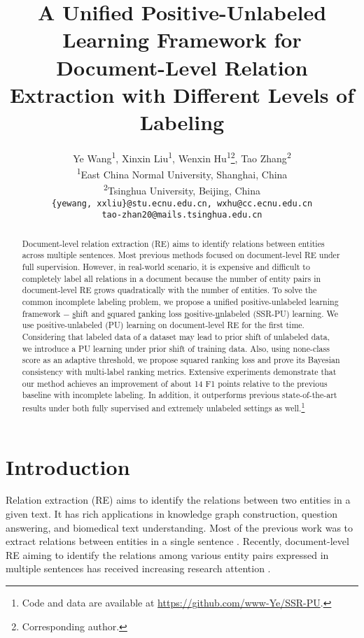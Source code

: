 \documentclass[11pt]{article}
\title{A Unified Positive-Unlabeled Learning Framework for Document-Level Relation Extraction with Different Levels of Labeling}
\author{Ye Wang\textsuperscript{1}, Xinxin Liu\textsuperscript{1}, Wenxin Hu\textsuperscript{1}\thanks{\enspace Corresponding author.}, Tao Zhang\textsuperscript{2} \\
  \textsuperscript{1}East China Normal University, Shanghai, China\\
  \textsuperscript{2}Tsinghua University, Beijing, China\\
  \texttt{\{yewang, xxliu\}@stu.ecnu.edu.cn, wxhu@cc.ecnu.edu.cn}\\
  \texttt{tao-zhan20@mails.tsinghua.edu.cn}}
\begin{document}
\maketitle
\begin{abstract}
Document-level relation extraction (RE) aims to identify relations between entities across multiple sentences. Most previous methods focused on document-level RE under full supervision. However, in real-world scenario, it is expensive and difficult to completely label all relations in a document because the number of entity pairs in document-level RE grows quadratically with the number of entities. \enspace To solve the common incomplete labeling problem, we propose a unified positive-unlabeled learning framework $-$ \underline{s}hift and \underline{s}quared \underline{r}anking loss \underline{p}ositive-\underline{u}nlabeled (SSR-PU) learning.
We use positive-unlabeled (PU) learning on document-level RE for the first time. Considering that labeled data of a dataset may lead to prior shift of unlabeled data, we introduce a PU learning under prior shift of training data. Also, using none-class score as an adaptive threshold, we propose squared ranking loss and prove its Bayesian consistency with multi-label ranking metrics. \enspace Extensive experiments demonstrate that our method achieves an improvement of about 14 F1 points relative to the previous baseline with incomplete labeling. In addition, it outperforms previous state-of-the-art results under both fully supervised and extremely unlabeled settings as well.\footnote{Code and data are available at \url{https://github.com/www-Ye/SSR-PU}.}
\end{abstract}

\section{Introduction}

Relation extraction (RE) aims to identify the relations between two entities in a given text. It has rich applications in knowledge graph construction, question answering, and biomedical text understanding. Most of the previous work was to extract relations between entities in a single sentence \citep{miwa-bansal-2016-end, zhang-etal-2018-graph}. Recently, document-level RE aiming to identify the relations \noindent among various entity pairs expressed in multiple sentences has received increasing research attention \citep{yao-etal-2019-docred, Zhou_Huang_Ma_Huang_2021,xu-etal-2022-document}.
\end{document}
